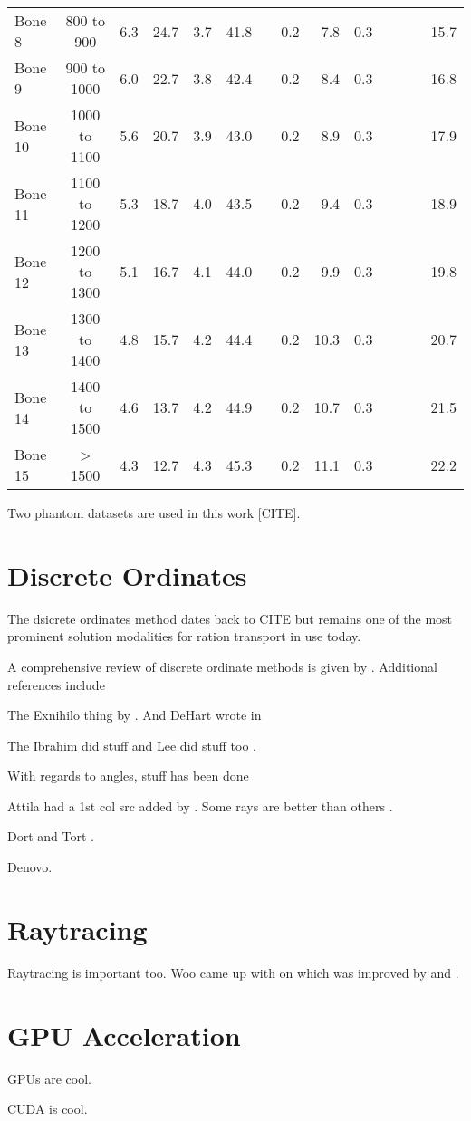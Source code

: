 \begin{sidewaystable}[ht]
\begin{tabular}{l c r r r r r r r r r r r r}
Bone 8      & 800 to 900    &  6.3 & 24.7 &  3.7 & 41.8 &     & 0.2 &  7.8 & 0.3 &     &     &     & 15.7 \\ 
Bone 9      & 900 to 1000   &  6.0 & 22.7 &  3.8 & 42.4 &     & 0.2 &  8.4 & 0.3 &     &     &     & 16.8 \\ 
Bone 10     & 1000 to 1100  &  5.6 & 20.7 &  3.9 & 43.0 &     & 0.2 &  8.9 & 0.3 &     &     &     & 17.9 \\ 
Bone 11     & 1100 to 1200  &  5.3 & 18.7 &  4.0 & 43.5 &     & 0.2 &  9.4 & 0.3 &     &     &     & 18.9 \\ 
Bone 12     & 1200 to 1300  &  5.1 & 16.7 &  4.1 & 44.0 &     & 0.2 &  9.9 & 0.3 &     &     &     & 19.8 \\
Bone 13     & 1300 to 1400  &  4.8 & 15.7 &  4.2 & 44.4 &     & 0.2 & 10.3 & 0.3 &     &     &     & 20.7 \\
Bone 14     & 1400 to 1500  &  4.6 & 13.7 &  4.2 & 44.9 &     & 0.2 & 10.7 & 0.3 &     &     &     & 21.5 \\  
Bone 15     & > 1500        &  4.3 & 12.7 &  4.3 & 45.3 &     & 0.2 & 11.1 & 0.3 &     &     &     & 22.2 \\[1ex]
\hline
\end{tabular}
\label{table:ctmap}
\end{sidewaystable}

Two phantom datasets are used in this work [CITE].

\section{Discrete Ordinates}\label{sec:discordlit}
The dsicrete ordinates method dates back to CITE but remains one of the most prominent solution modalities for ration transport in use today.

A comprehensive review of discrete ordinate methods is given by \citet{ref:lewise}. Additional references include 


The Exnihilo thing by \citet{ref:evanst}. And DeHart wrote in \citep{ref:dehartm}

The Ibrahim did stuff \citep{ref:ibrahima} and Lee did stuff too \citep{ref:leeb}.

With regards to angles, stuff has been done \citep{ref:ahrensc}

Attila had a 1st col src added by \citep{ref:wareingt}. Some rays are better than others \citep{ref:mathewsk}.

Dort and Tort \citep{ref:rhoadesw}.

Denovo.

\section{Raytracing}

Raytracing is important too. Woo came up with on \citep{ref:wooa} which was improved by \citet{ref:liuy} and \citet{ref:hel}.

\section{GPU Acceleration}
GPUs are cool.

CUDA is cool.


\endinput
